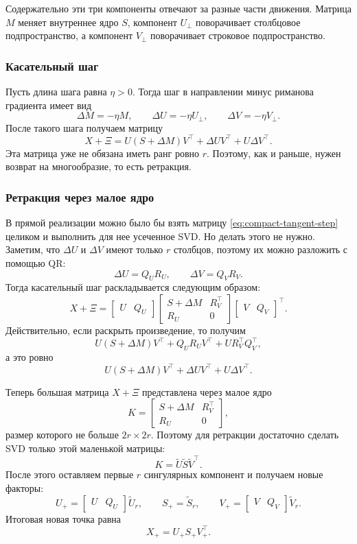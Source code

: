 \documentclass[a4paper,12pt]{article}
\begin{document}
Содержательно эти три компоненты отвечают за разные части движения. Матрица $M$ меняет внутреннее ядро $S$, компонент $U_\perp$ поворачивает столбцовое подпространство, а компонент $V_\perp$ поворачивает строковое подпространство.

\subsubsection{Касательный шаг}

Пусть длина шага равна $\eta>0$. Тогда шаг в направлении минус риманова градиента имеет вид
\[
\Delta M=-\eta M,\qquad
\Delta U=-\eta U_\perp,\qquad
\Delta V=-\eta V_\perp.
\]
После такого шага получаем матрицу
\begin{equation}
\label{eq:compact-tangent-step}
X+\Xi
=U(S+\Delta M)V^\top+\Delta U V^\top+U\Delta V^\top.
\end{equation}
Эта матрица уже не обязана иметь ранг ровно $r$. Поэтому, как и раньше, нужен возврат на многообразие, то есть ретракция.

\subsubsection{Ретракция через малое ядро}

В прямой реализации можно было бы взять матрицу \eqref{eq:compact-tangent-step} целиком и выполнить для нее усеченное SVD. Но делать этого не нужно. Заметим, что $\Delta U$ и $\Delta V$ имеют только $r$ столбцов, поэтому их можно разложить с помощью QR:
\[
\Delta U=Q_U R_U,\qquad \Delta V=Q_V R_V.
\]
Тогда касательный шаг раскладывается следующим образом:
\[
X+\Xi
=
\begin{bmatrix}U & Q_U\end{bmatrix}
\begin{bmatrix}
S+\Delta M & R_V^\top\\
R_U & 0
\end{bmatrix}
\begin{bmatrix}V & Q_V\end{bmatrix}^\top.
\]
Действительно, если раскрыть произведение, то получим
\[
U(S+\Delta M)V^\top+Q_UR_UV^\top+UR_V^\top Q_V^\top,
\]
а это ровно
\[
U(S+\Delta M)V^\top+\Delta U V^\top+U\Delta V^\top.
\]

Теперь большая матрица $X+\Xi$ представлена через малое ядро
\[
K=
\begin{bmatrix}
S+\Delta M & R_V^\top\\
R_U & 0
\end{bmatrix},
\]
размер которого не больше $2r\times 2r$. Поэтому для ретракции достаточно сделать SVD только этой маленькой матрицы:
\[
K=\widetilde U\widetilde S\widetilde V^\top.
\]
После этого оставляем первые $r$ сингулярных компонент и получаем новые факторы:
\[
U_+=\begin{bmatrix}U & Q_U\end{bmatrix}\widetilde U_r,\qquad
S_+=\widetilde S_r,\qquad
V_+=\begin{bmatrix}V & Q_V\end{bmatrix}\widetilde V_r.
\]
Итоговая новая точка равна
\[
X_+=U_+S_+V_+^\top.
\]
\end{document}
